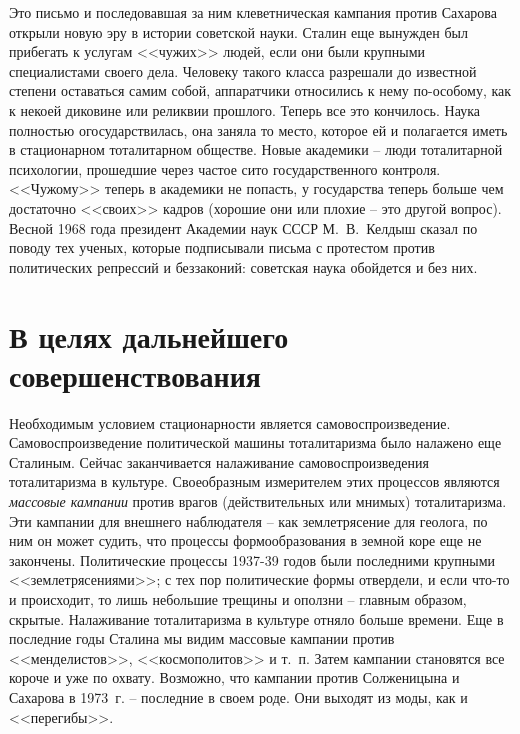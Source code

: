 \documentclass{book}
\begin{document}
Это письмо и последовавшая за ним клеветническая кампания против Сахарова открыли новую эру в истории советской науки. Сталин еще вынужден был прибегать к услугам <<чужих>> людей, если они были крупными специалистами своего дела. Человеку такого класса разрешали до известной степени оставаться самим собой, аппаратчики относились к нему по-особому, как к некоей диковине или реликвии прошлого. Теперь все это кончилось. Наука полностью огосударствилась, она заняла то место, которое ей и полагается иметь в стационарном тоталитарном обществе. Новые академики -- люди тоталитарной психологии, прошедшие через частое сито государственного контроля. <<Чужому>> теперь в академики не попасть, у государства теперь больше чем достаточно <<своих>> кадров (хорошие они или плохие -- это другой вопрос). Весной 1968 года президент Академии наук СССР М.~В.~Келдыш сказал по поводу тех ученых, которые подписывали письма с протестом против политических репрессий и беззаконий: советская наука обойдется и без них.



\section{В целях дальнейшего совершенствования}

Необходимым условием стационарности является самовоспроизведение. Самовоспроизведение политической машины тоталитаризма было 
налажено еще Сталиным. Сейчас заканчивается налаживание самовоспроизведения тоталитаризма в культуре. Своеобразным измерителем 
этих процессов являются \textit{массовые кампании}  против врагов (действительных или мнимых) тоталитаризма. Эти кампании для
внешнего наблюдателя -- как землетрясение для геолога, по ним он может судить, что процессы формообразования в земной коре еще
не закончены. Политические процессы 1937-39 годов были последними крупными <<землетрясениями>>; с тех пор полити­ческие формы 
отвердели, и если что-то и происходит, то лишь небольшие трещины и оползни -- главным образом, скрытые. Налаживание 
тоталитаризма в культуре отняло больше времени. Еще в последние годы Сталина мы видим массовые кампании против <<менделистов>>, 
<<космополитов>> и т.~п. Затем кампании становятся все короче и уже по охвату. Возможно, что кампании против Солженицына и 
Сахарова в 1973~г. -- последние в своем роде. Они выходят из моды, как и <<перегибы>>.
\end{document}
